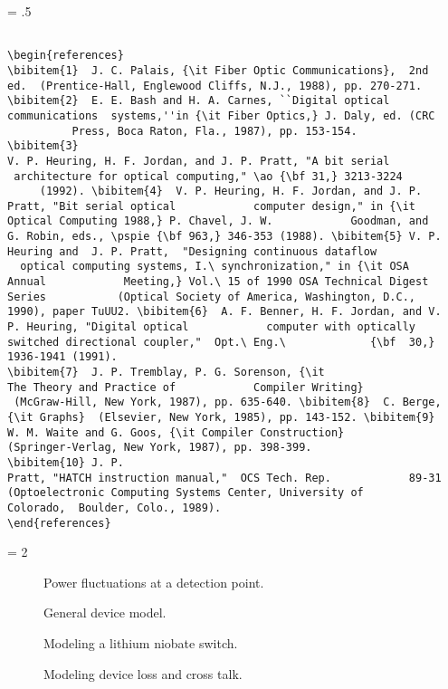 \newpage
\baselineskip = .5\baselineskip  %
\begin{verbatim}

\begin{references}
\bibitem{1}  J. C. Palais, {\it Fiber Optic Communications},  2nd
ed.  (Prentice-Hall, Englewood Cliffs, N.J., 1988), pp. 270-271.
\bibitem{2}  E. E. Bash and H. A. Carnes, ``Digital optical
communications  systems,''in {\it Fiber Optics,} J. Daly, ed. (CRC
          Press, Boca Raton, Fla., 1987), pp. 153-154.
\bibitem{3}
V. P. Heuring, H. F. Jordan, and J. P. Pratt, "A bit serial
 architecture for optical computing," \ao {\bf 31,} 3213-3224
     (1992). \bibitem{4}  V. P. Heuring, H. F. Jordan, and J. P.
Pratt, "Bit serial optical            computer design," in {\it
Optical Computing 1988,} P. Chavel, J. W.            Goodman, and
G. Robin, eds., \pspie {\bf 963,} 346-353 (1988). \bibitem{5} V. P.
Heuring and  J. P. Pratt,  "Designing continuous dataflow
  optical computing systems, I.\ synchronization," in {\it OSA
Annual            Meeting,} Vol.\ 15 of 1990 OSA Technical Digest
Series           (Optical Society of America, Washington, D.C.,
1990), paper TuUU2. \bibitem{6}  A. F. Benner, H. F. Jordan, and V.
P. Heuring, "Digital optical            computer with optically
switched directional coupler,"  Opt.\ Eng.\             {\bf  30,}
1936-1941 (1991).
\bibitem{7}  J. P. Tremblay, P. G. Sorenson, {\it
The Theory and Practice of            Compiler Writing}
 (McGraw-Hill, New York, 1987), pp. 635-640. \bibitem{8}  C. Berge,
{\it Graphs}  (Elsevier, New York, 1985), pp. 143-152. \bibitem{9}
W. M. Waite and G. Goos, {\it Compiler Construction}
(Springer-Verlag, New York, 1987), pp. 398-399.
\bibitem{10} J. P.
Pratt, "HATCH instruction manual,"  OCS Tech. Rep.            89-31
(Optoelectronic Computing Systems Center, University of
Colorado,  Boulder, Colo., 1989).
\end{references}

\end{verbatim}
\newpage
\baselineskip = 2\baselineskip  %

\begin{figure}
\caption{ Power fluctuations at a detection point.} \end{figure}

\begin{figure}
\caption{General device model.} \end{figure}
\begin{figure} \caption{Modeling a lithium niobate switch.}
\end{figure}
\begin{figure}
\caption{Modeling device loss and cross talk.} \end{figure}

